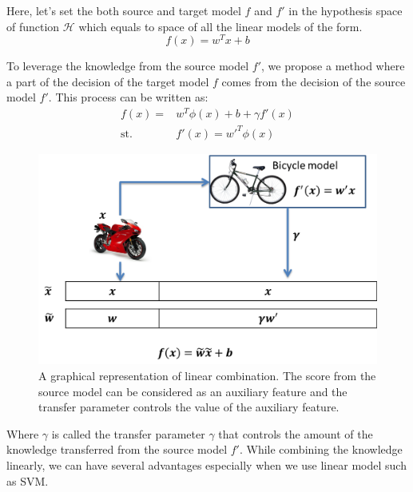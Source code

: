 Here, let's set the both source and target model $f$ and $f'$ in the hypothesis space of function $\mathcal{H}$ which equals to space of all the linear models of the form. 
\begin{equation}
f(x)=w^Tx+b
\end{equation}

To leverage the knowledge from the source model $f'$, we propose a method where a part of the decision of the target model $f$ comes from the decision of the source model $f'$. This process can be written as:
\begin{equation}\label{eq:single:linear}
\begin{aligned}
 f(x) = & w^T\phi(x)+b+\gamma f'(x) \\
\text{st.} \qquad & f'(x) = w'^T\phi(x)
\end{aligned}
\end{equation}

\begin{figure}
	\centering
	\includegraphics[scale=.6]{transfer/fig/argumentation.png}
	\caption{A graphical representation of linear combination. The score from the source model can be considered as an auxiliary feature and the transfer parameter controls the value of the auxiliary feature.}\label{fig:single:arg}
\end{figure}
Where $\gamma$ is called the transfer parameter $\gamma$ that controls the amount of the knowledge transferred from the source model $f'$. 
While combining the knowledge linearly, we can have several advantages especially when we use linear model such as SVM.

